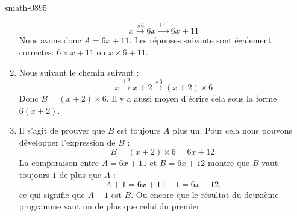 \begin{corrige}{smath-0895}
\begin{enumerate}
\begin{equation}
        \boxed{x}\stackrel{\times 6}{\longrightarrow}\boxed{6x}\stackrel{+11}{\longrightarrow}\boxed{6x+11}
    \end{equation}
    Nous avons donc \( A=6x+11\). Les réponses suivante sont également correctes: \( 6\times x+11\) ou \( x\times 6+11\).
\item
    Nous suivant le chemin suivant :
    \begin{equation}
        \boxed{x}\stackrel{+2}{\longrightarrow}\boxed{x+2}\stackrel{\times 6}{\longrightarrow}\boxed{ (x+2)\times 6  }
    \end{equation}
    Donc \( B=(x+2)\times 6\). Il y a aussi moyen d'écrire cela sous la forme \( 6(x+2)\).

\item
    Il s'agit de prouver que \( B\) est toujours \( A\) plus un. Pour cela nous pouvons développer l'expression de \( B\) :
    \begin{equation}
        B=(x+2)\times 6=6x+12.
    \end{equation}
    La comparaison entre \( A=6x+11\) et \( B=6x+12\) montre que \( B\) vaut toujours \( 1\) de plus que \( A\) :
    \begin{equation}
        A+1=6x+11+1=6x+12,
    \end{equation}
    ce qui signifie que \( A+1\) est \( B\). Ou encore que le résultat du deuxième programme vaut un de plus que celui du premier.
            
    \end{enumerate}
    

\end{corrige}
